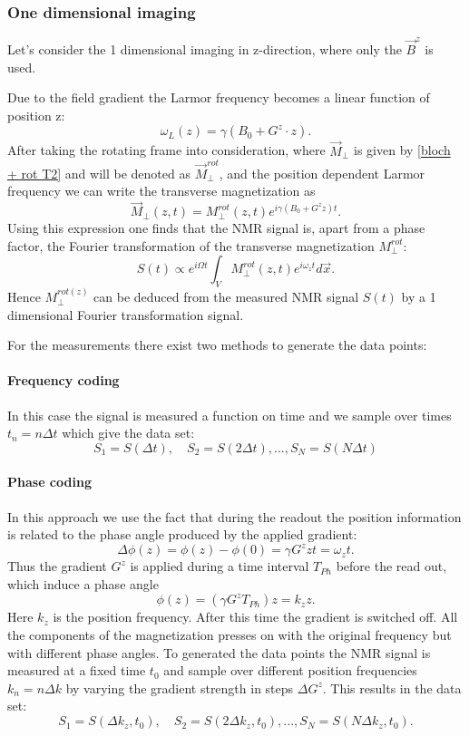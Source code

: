 \subsubsection{One dimensional imaging}
Let's consider the  1 dimensional imaging in z-direction, where only the $\vec{B}^z$ is used.  

Due to the field gradient the Larmor frequency becomes a linear function of position z:
\begin{equation}
\omega_L(z) = \gamma(B_0 + G^z\cdot z).
\end{equation}
After taking the rotating frame into consideration, where $\vec{M}_\perp$ is given by \ref{bloch + rot T2} and will be denoted as $\vec{M}_\perp^{rot}$, and the position dependent Larmor frequency we can write the transverse magnetization as
\begin{equation}
\vec{M}_\perp(z, t) = M_\perp^{rot}(z,t)e^{i\gamma(B_0 + G^{z}z)t}.
\end{equation}
Using this expression one finds that the NMR signal is, apart from a phase factor, the Fourier transformation of the transverse magnetization $M_\perp^{rot}$:
\begin{equation}
S(t)\propto e^{i\Omega t} \int_{V} M_\perp^{rot}(z,t) e^{i\omega_z t} d\vec{x}.
\end{equation}
Hence $M_\perp^{rot(z)}$ can be deduced from the measured NMR signal $S(t)$ by a 1 dimensional Fourier transformation signal.

For the measurements there exist two methods to generate the data points:
\paragraph{Frequency coding}
In this case the signal is measured a function on time and we sample over times $t_n = n\Delta t$ which give the data set:
$$S_1 = S(\Delta t), \quad S_2 = S(2\Delta t), ..., S_N = S(N\Delta t)$$
\paragraph{Phase coding}
In this approach we use the fact that during the readout the position information is related to the phase angle produced by the applied gradient:
\begin{equation}
\Delta \phi(z)= \phi(z)-\phi(0) = \gamma G^z z t= \omega_z t.
\end{equation}
Thus the gradient  $G^z$ is applied during a time interval $T_{Ph}$ before the read out, which induce a phase angle \begin{equation}
\phi(z) = (\gamma G^z T_{Ph})z = k_z z.
\end{equation}
Here $k_z$ is the position frequency. After this time the gradient is switched off. All the components of the magnetization presses on with the original frequency but with different phase angles.  
To generated the data points the NMR signal is measured at a fixed time $t_0$ and sample over different position frequencies $k_n = n\Delta k$ by varying the gradient strength in steps $\Delta G^z$.  This results in the data set: 
$$S_1 = S(\Delta k_z,t_0), \quad S_2 = S(2\Delta k_z, t_0), ..., S_N = S(N\Delta k_z, t_0).$$

